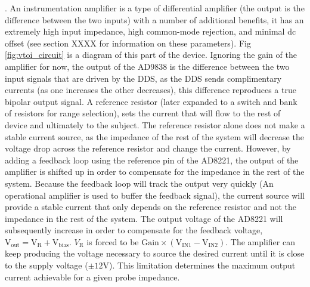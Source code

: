  
 
. An instrumentation amplifier is a type of differential amplifier (the output is the difference between the two inputs) with a number of additional benefits, it has an extremely high input impedance, high common-mode rejection, and minimal dc offset (see section XXXX for information on these parameters). Fig \ref{fig:vtoi_circuit} is a diagram of this part of the device. Ignoring the gain of the amplifier for now, the output of the AD9838 is the difference between the two input signals that are driven by the DDS, as the DDS sends complimentary currents (as one increases the other decreases), this difference reproduces a true bipolar output signal. A reference resistor (later expanded to a switch and bank of resistors for range selection), sets the current that will flow to the rest of device and ultimately to the subject. The reference resistor alone does not make a stable current source, as the impedance of the rest of the system will decrease the voltage drop across the reference resistor and change the current. However, by adding a feedback loop using the reference pin of the AD8221, the output of the amplifier is shifted up in order to compensate for the impedance in the rest of the system. Because the feedback loop will track the output very quickly (An operational amplifier is used to buffer the feedback signal), the current source will provide a stable current that only depends on the reference resistor and not the impedance in the rest of the system. The output voltage of the AD8221 will subsequently increase in order to compensate for the feedback voltage, $\text{V}_\text{out} = \text{V}_\text{R} + \text{V}_\text{bias}$. $V_\text{R}$ is forced to be $\text{Gain}\times(\text{V}_\text{IN1} - \text{V}_\text{IN2})$. The amplifier can keep producing the voltage necessary to source the desired current until it is close to the supply voltage ($\pm12$V). This limitation determines the maximum output current achievable for a given probe impedance.

